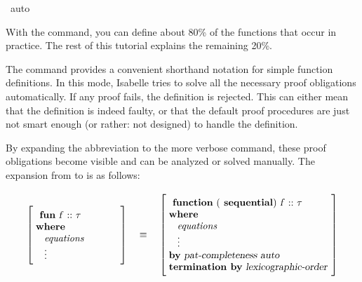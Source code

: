 \begin{isabellebody}
\begin{isamarkuptxt}
\begin{isabelle}
\end{isabelle}%
\end{isamarkuptxt}%
\isamarkuptrue%
\isamarkupfalse%
\ auto\ \isanewline
{}\isamarkupfalse%
%
\endisatagproof
{\isafoldproof}%
%
\isadelimproof
%
\endisadelimproof
%
\begin{isamarkuptext}%
With the  command, you can define about 80\% of the
  functions that occur in practice. The rest of this tutorial explains
  the remaining 20\%.%
\end{isamarkuptext}%
\isamarkuptrue%
%
\isamarkuptrue%
%
\begin{isamarkuptext}%
The  command provides a
  convenient shorthand notation for simple function definitions. In
  this mode, Isabelle tries to solve all the necessary proof obligations
  automatically. If any proof fails, the definition is
  rejected. This can either mean that the definition is indeed faulty,
  or that the default proof procedures are just not smart enough (or
  rather: not designed) to handle the definition.

  By expanding the abbreviation to the more verbose  command, these proof obligations become visible and can be analyzed or
  solved manually. The expansion from  to  is as follows:

\end{isamarkuptext}


\[\left[\;\begin{minipage}{0.25\textwidth}\vspace{6pt}
\cmd{fun} \isa{f\ {\isaliteral{3A}{\isacharcolon}}{\isaliteral{3A}{\isacharcolon}}\ {\isaliteral{5C3C7461753E}{\isasymtau}}}\\%
\cmd{where}\\%
\hspace*{2ex}{\it equations}\\%
\hspace*{2ex}\vdots\vspace*{6pt}
\end{minipage}\right]
\quad\equiv\quad
\left[\;\begin{minipage}{0.48\textwidth}\vspace{6pt}
\cmd{function} \isa{{\isaliteral{28}{\isacharparenleft}}}\cmd{sequential}\isa{{\isaliteral{29}{\isacharparenright}}\ f\ {\isaliteral{3A}{\isacharcolon}}{\isaliteral{3A}{\isacharcolon}}\ {\isaliteral{5C3C7461753E}{\isasymtau}}}\\%
\cmd{where}\\%
\hspace*{2ex}{\it equations}\\%
\hspace*{2ex}\vdots\\%
\cmd{by} \isa{pat{\isaliteral{5F}{\isacharunderscore}}completeness\ auto}\\%
\cmd{termination by} \isa{lexicographic{\isaliteral{5F}{\isacharunderscore}}order}\vspace{6pt}
\end{minipage}
\right]\]


\end{isabellebody}
